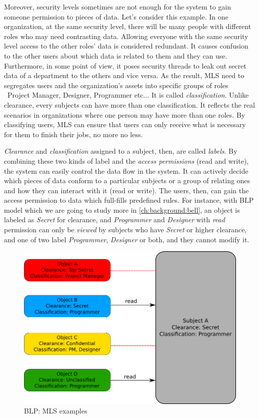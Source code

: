 Moreover, security levels sometimes are not enough for the system to gain someone permission to pieces of data.
Let's consider this example. 
In one organization, at the same security level, there will be many people with different roles who may need contrasting data.
Allowing everyone with the same security level access to the other roles' data is considered redundant.
It causes confusion to the other users about which data is related to them and they can use.
Furthermore, in some point of view, it poses security threads to leak out secret data of a department to the others and vice versa.
As the result, MLS need to segregates users and the organization's assets into specific groups of roles \eg\ Project Manager, Designer, Programmer etc...
It is called \emph{classification}.
Unlike clearance, every subjects can have more than one classification.
It reflects the real scenarios in organizations where one person may have more than one roles.
By classifying users, MLS can ensure that users can only receive what is necessary for them to finish their jobs, no more no less.

\emph{Clearance} and \emph{classification} assigned to a subject, then, are called \emph{labels}.
By combining these two kinds of label and the \emph{access permissions} (read and write), the system can easily control the data flow in the system.
It can actively decide which pieces of data conform to a particular subjects or a group of relating ones and how they can interact with it (read or write).
The users, then, can gain the access permission to data which full-fills predefined rules.
For instance, with BLP model which we are going to study more in \autoref{ch:background:bell}, an object is labeled as \emph{Secret} for clearance, and \emph{Programmer} and \emph{Designer} with \emph{read} permission can only be \emph{viewed} by subjects who have \emph{Secret} or higher clearance, and one of two label \emph{Programmer}, \emph{Designer} or both, and they cannot modify it.

\begin{figure}[bth]                                                                                                                                                  
\myfloatalign
\includegraphics[width=1.0\linewidth]{gfx/chapter_2/mls_example}
\caption[BLP: MLS examples]{BLP: MLS examples}\label{fig:mls_example}
\end{figure}

